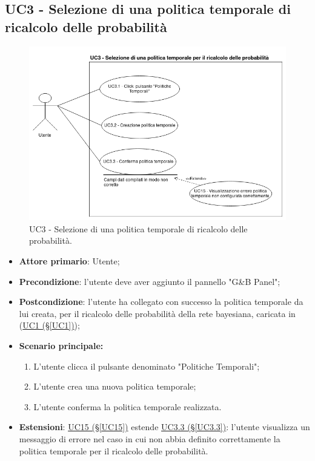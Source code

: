\subsection{UC3 - Selezione di una politica temporale di ricalcolo delle probabilità}\label{UC3}

\begin{figure}[H]
\centering
\includegraphics[scale=0.5]{./images/UC3.png}
\caption{UC3 - Selezione di una politica temporale di ricalcolo delle probabilità.}
\end{figure}

\begin{itemize}
	\item \textbf{Attore primario}: Utente; 
	\item \textbf{Precondizione}: l'utente deve aver aggiunto il pannello "G\&B Panel";
	\item \textbf{Postcondizione}: l'utente ha collegato con successo la politica temporale da lui creata, per il ricalcolo delle probabilità della rete bayesiana, caricata in (\hyperref[UC1]{UC1 (§\ref*{UC1})});	
	\item \textbf{Scenario principale:}
	\begin{enumerate}
		\item L'utente clicca il pulsante denominato "Politiche Temporali";
		\item L'utente crea una nuova politica temporale; 
		\item L'utente conferma la politica temporale realizzata.
	\end{enumerate}
	\item \textbf{Estensioni}: \hyperref[UC15]{UC15 (§\ref*{UC15})} estende \hyperref[UC3.3]{UC3.3 (§\ref*{UC3.3})}: l'utente visualizza un messaggio di errore nel caso in cui non abbia definito correttamente la politica temporale per il ricalcolo delle probabilità.
	
\end{itemize}

